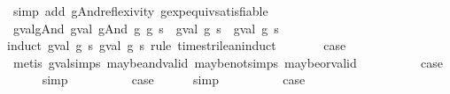 \begin{isabellebody}
%
\isatagproof
{}\isamarkupfalse%
\ {\isacharparenleft}simp\ add{\isacharcolon}\ gAnd{\isacharunderscore}reflexivity\ gexp{\isacharunderscore}equiv{\isacharunderscore}satisfiable{\isacharparenright}%
\endisatagproof
{\isafoldproof}%
%
\isadelimproof
\isanewline
%
\endisadelimproof
\isanewline
{}\isamarkupfalse%
\ gval{\isacharunderscore}gAnd{\isacharcolon}\ {\isachardoublequoteopen}gval\ {\isacharparenleft}gAnd\ g{}\ g{}{\isacharparenright}\ s\ {\isacharequal}\ {\isacharparenleft}gval\ g{}\ s{\isacharparenright}\ {\isasymand}\isactrlsub {\isacharquery}\ {\isacharparenleft}gval\ g{}\ s{\isacharparenright}{\isachardoublequoteclose}\isanewline
%
\isadelimproof
%
\endisadelimproof
%
\isatagproof
{}\isamarkupfalse%
{\isacharparenleft}induct\ {\isachardoublequoteopen}gval\ g{}\ s{\isachardoublequoteclose}\ {\isachardoublequoteopen}gval\ g{}\ s{\isachardoublequoteclose}\ rule{\isacharcolon}\ times{\isacharunderscore}trilean{\isachardot}induct{\isacharparenright}\isanewline
{}\isamarkupfalse%
\ {}\isanewline
\ \ \isamarkupfalse%
\ \isamarkupfalse%
\ {\isacharquery}case\isanewline
\ \ \ \ \isamarkupfalse%
\ {\isacharparenleft}metis\ gval{\isachardot}simps{\isacharparenleft}{}{\isacharparenright}\ maybe{\isacharunderscore}and{\isacharunderscore}valid\ maybe{\isacharunderscore}not{\isachardot}simps{\isacharparenleft}{}{\isacharparenright}\ maybe{\isacharunderscore}or{\isacharunderscore}valid{\isacharparenright}\isanewline
{}\isamarkupfalse%
\isanewline
\ \ \isamarkupfalse%
\ {\isachardoublequoteopen}{}{\isacharunderscore}{}{\isachardoublequoteclose}\isanewline
\ \ \isamarkupfalse%
\ \isamarkupfalse%
\ {\isacharquery}case\isanewline
\ \ \ \ \isamarkupfalse%
\ simp\isanewline
{}\isamarkupfalse%
\isanewline
\ \ \isamarkupfalse%
\ {\isachardoublequoteopen}{}{\isacharunderscore}{}{\isachardoublequoteclose}\isanewline
\ \ \isamarkupfalse%
\ \isamarkupfalse%
\ {\isacharquery}case\isanewline
\ \ \ \ \isamarkupfalse%
\ simp\isanewline
{}\isamarkupfalse%
\isanewline
\ \ \isamarkupfalse%
\ {}\isanewline
\ \ \isamarkupfalse%
\ \isamarkupfalse%
\ {\isacharquery}case\isanewline
\ \ \ \ \isamarkupfalse%

\end{isabellebody}
